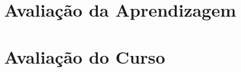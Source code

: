 \postextual
%

%
\begin{apendicesenv}
    \chapter{Avaliação da Aprendizagem}\label{apend-a}
    
    
    \chapter{Avaliação do Curso}\label{apend-b}
    
    
%

\end{apendicesenv}


